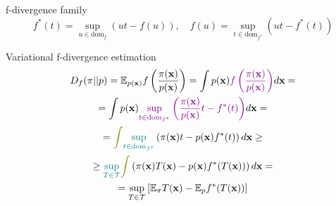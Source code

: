 \begin{frame}{f-divergence family}
	\vspace{-0.3cm}
	\[
		f^*(t) = \sup_{u \in \text{dom}_f} \left( ut - f(u) \right), \quad f(u) = \sup_{t \in \text{dom}_{f^*}} \left( ut - f^*(t) \right)
	\]
	\vspace{-0.5cm}
	\begin{block}{Variational f-divergence estimation}
		\vspace{-0.7cm}
		\begin{multline*}
			D_f(\pi || p) = \bbE_{p(\bx)}  f\left( \frac{\pi(\bx)}{p(\bx)} \right)  = \int p(\bx) {\color{violet}f\left( \frac{\pi(\bx)}{p(\bx)} \right) } d \bx = \\ = \int p(\bx) {\color{violet} \sup_{t \in \text{dom}_{f^*}} \left( \frac{\pi(\bx)}{p(\bx)} t - f^*(t) \right)} d \bx = \\ 
			= {\color{olive}\int} {\color{teal} \sup_{t \in \text{dom}_{f^*}}} \left( \pi(\bx)t - p(\bx) f^*(t) \right) d \bx \geq \\
		 \geq {\color{teal}\sup_{T \in \cT}} {\color{olive}\int} \left( \pi(\bx)T(\bx) - p(\bx) f^*(T(\bx)) \right) d \bx = \\
		 = \sup_{T \in \cT} \left[\bbE_{\pi}T(\bx) -  \bbE_p f^*(T(\bx)) \right]
		\end{multline*}
		\vspace{-0.6cm}
	\end{block}
\end{frame}
